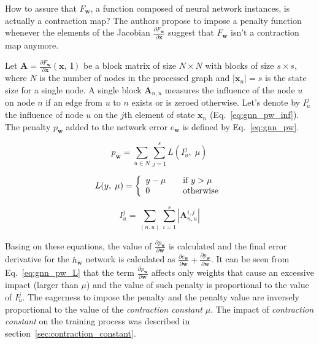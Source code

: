 \noindent How to assure that $F_{\bm{w}}$, a function composed of neural network instances, is actually a contraction map? The authors propose to impose a penalty function whenever the elements of the Jacobian $\frac{\partial F_{\bm{w}}}{\partial \bm{x}}$ suggest that $F_{\bm{w}}$ isn't a contraction map anymore.

Let $\bm{A} = \frac{\partial F_{\bm{w}}}{\partial \bm{x}}(\bm{x}, \; \bm{l})$ be a block matrix of size $N \times N$ with blocks of size $s \times s$, where $N$ is the number of nodes in the processed graph and $|\bm{x}_n| = s$ is the state size for a single node. A single block $\bm{A}_{n,u}$ measures the influence of the node $u$ on node $n$ if an edge from $u$ to $n$ exists or is zeroed otherwise. Let's denote by $I_u^j$ the influence of node $u$ on the $j$th element of state $\bm{x}_n$ (Eq.~\ref{eq:gnn_pw_inf}). The penalty $p_{\bm{w}}$ added to the network error $e_{\bm{w}}$ is defined by Eq.~\ref{eq:gnn_pw}.

\begin{equation}
p_{\bm{w}} = \sum_{u \in N} \sum_{j = 1}^{s} L(I_u^j, \; \mu)
\label{eq:gnn_pw}
\end{equation}

\begin{equation}
L(y, \; \mu) = \left\{
\begin{array}{l l}
	y - \mu		& \quad \text{if $y > \mu$} \\
	0			& \quad \text{otherwise}
\end{array} \right.
\label{eq:gnn_pw_L}
\end{equation}

\begin{equation}
I_u^j =  \sum_{(n, u)} \sum_{i = 1}^{s} |\bm{A}_{n, u}^{i, j}|
\label{eq:gnn_pw_inf}
\end{equation}

Basing on these equations, the value of $\frac{\partial p_{\bm{w}}}{\partial \bm{w}}$ is calculated and the final error derivative for the $h_{\bm{w}}$ network is calculated as $\frac{\partial e_{\bm{w}}}{\partial \bm{w}} + \frac{\partial p_{\bm{w}}}{\partial \bm{w}}$. It can be seen from Eq.~\ref{eq:gnn_pw_L} that the  term $\frac{\partial p_{\bm{w}}}{\partial \bm{w}}$ affects only weights that cause an excessive impact (larger than $\mu$) and the value of such penalty is proportional to the value of $I_u^j$. The eagerness to impose the penalty and the penalty value are inversely proportional to the value of the \emph{contraction constant} $\mu$. The impact of \emph{contraction constant} on the training process was described in section~\ref{sec:contraction_constant}.

